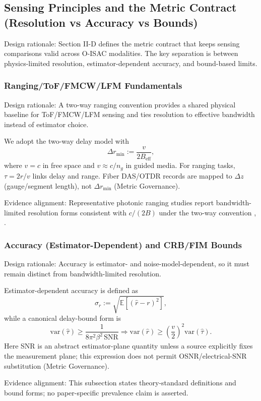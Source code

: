 \subsection{Sensing Principles and the Metric Contract (Resolution vs Accuracy vs Bounds)}
Design rationale: Section II-D defines the metric contract that keeps sensing comparisons valid across O-ISAC modalities. The key separation is between physics-limited resolution, estimator-dependent accuracy, and bound-based limits.

\subsubsection{Ranging/ToF/FMCW/LFM Fundamentals}
Design rationale: A two-way ranging convention provides a shared physical baseline for ToF/FMCW/LFM sensing and ties resolution to effective bandwidth instead of estimator choice.

We adopt the two-way delay model with
\[
\Delta r_{\min} := \frac{v}{2B_{\text{eff}}},
\]
where \(v=c\) in free space and \(v\approx c/n_g\) in guided media. For ranging tasks, \(\tau=2r/v\) links delay and range. Fiber DAS/OTDR records are mapped to \(\Delta z\) (gauge/segment length), not \(\Delta r_{\min}\) (Metric Governance).

Evidence alignment: Representative photonic ranging studies report bandwidth-limited resolution forms consistent with \(c/(2B)\) under the two-way convention \cite{O_ISAC_026}, \cite{O_ISAC_034}.

\subsubsection{Accuracy (Estimator-Dependent) and CRB/FIM Bounds}
Design rationale: Accuracy is estimator- and noise-model-dependent, so it must remain distinct from bandwidth-limited resolution.

Estimator-dependent accuracy is defined as
\[
\sigma_r := \sqrt{\mathbb{E}[(\hat r-r)^2]},
\]
while a canonical delay-bound form is
\[
\mathrm{var}(\hat\tau) \ge \frac{1}{8\pi^2\beta^2\,\mathrm{SNR}} \Rightarrow \mathrm{var}(\hat r) \ge \left(\frac{v}{2}\right)^2\mathrm{var}(\hat\tau).
\]
Here SNR is an abstract estimator-plane quantity unless a source explicitly fixes the measurement plane; this expression does not permit OSNR/electrical-SNR substitution (Metric Governance).

Evidence alignment: This subsection states theory-standard definitions and bound forms; no paper-specific prevalence claim is asserted.

